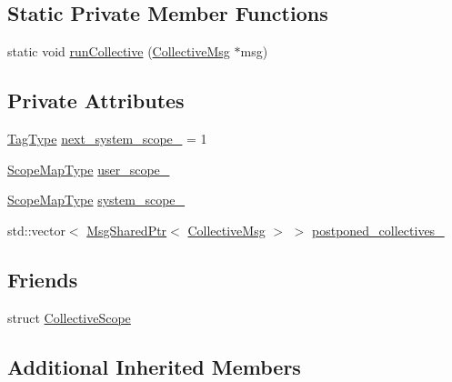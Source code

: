 \subsection*{Static Private Member Functions}
\begin{DoxyCompactItemize}
\item 
static void \hyperlink{structvt_1_1collective_1_1_collective_alg_a9ed7397e91a18458c3a578be3605baa9}{run\+Collective} (\hyperlink{structvt_1_1collective_1_1_collective_alg_1_1_collective_msg}{Collective\+Msg} $\ast$msg)
\end{DoxyCompactItemize}
\subsection*{Private Attributes}
\begin{DoxyCompactItemize}
\item 
\hyperlink{namespacevt_a84ab281dae04a52a4b243d6bf62d0e52}{Tag\+Type} \hyperlink{structvt_1_1collective_1_1_collective_alg_ad830a204e2989b28cc90d54e83f518b5}{next\+\_\+system\+\_\+scope\+\_\+} = 1
\item 
\hyperlink{structvt_1_1collective_1_1_collective_alg_abf644b20fe35cf654f5d4a6702ef5183}{Scope\+Map\+Type} \hyperlink{structvt_1_1collective_1_1_collective_alg_a72bb12e5bbe0c52e867c81e76db318d9}{user\+\_\+scope\+\_\+}
\item 
\hyperlink{structvt_1_1collective_1_1_collective_alg_abf644b20fe35cf654f5d4a6702ef5183}{Scope\+Map\+Type} \hyperlink{structvt_1_1collective_1_1_collective_alg_a947ce4f129e1cf626da031595fe5df5c}{system\+\_\+scope\+\_\+}
\item 
std\+::vector$<$ \hyperlink{namespacevt_ab2b3d506ec8e8d1540aede826d84a239}{Msg\+Shared\+Ptr}$<$ \hyperlink{structvt_1_1collective_1_1_collective_alg_1_1_collective_msg}{Collective\+Msg} $>$ $>$ \hyperlink{structvt_1_1collective_1_1_collective_alg_ac6db64bfd14e19d0a31f69a349a452c5}{postponed\+\_\+collectives\+\_\+}
\end{DoxyCompactItemize}
\subsection*{Friends}
\begin{DoxyCompactItemize}
\item 
struct \hyperlink{structvt_1_1collective_1_1_collective_alg_a915db0886f5b77be011e5a55413319f5}{Collective\+Scope}
\end{DoxyCompactItemize}
\subsection*{Additional Inherited Members}


